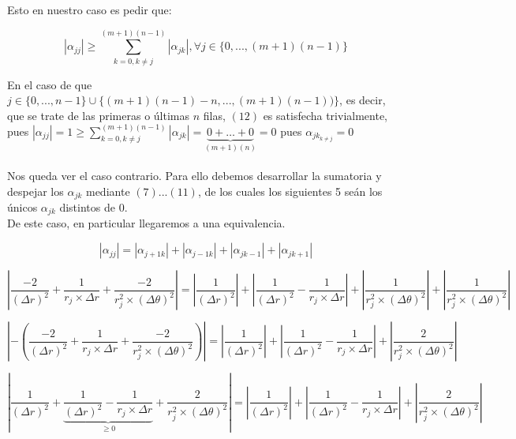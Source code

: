 Esto en nuestro caso es pedir que:

\begin{equation}
 \left | \alpha_{jj} \right | \geq \sum_{k=0,k \neq j}^{(m+1)(n-1)} \left | \alpha_{jk} \right |, \forall j \in \{ 0,...,(m+1)(n-1)\}
\end{equation}

En el caso de que $j \in \{0,...,n-1\} \cup \{(m+1)(n-1)-n,...,(m+1)(n-1))\}$, es decir, que se trate de las primeras o \'ultimas $n$ filas, $(12)$ es satisfecha trivialmente, pues  $\left | \alpha_{jj} \right | = 1 \geq \sum_{k=0,k \neq j}^{(m+1)(n-1)} \left | \alpha_{jk} \right | =  \underbrace{0+ \ldots +0}_{(m+1)(n)} = 0$ pues $\alpha_{jk_{k\neq j}}=0 $ 
\\
\\
Nos queda ver el caso contrario. Para ello debemos desarrollar la sumatoria y despejar los $\alpha_{jk}$ mediante $(7)...(11)$, de los cuales los siguientes 5 se\'an los \'unicos $\alpha_{jk}$ distintos de $0$.
\\
De este caso, en particular llegaremos a una equivalencia.

\begin{equation}
 \left | \alpha_{jj} \right | = \left | \alpha_{j+1k} \right | + \left | \alpha_{j-1k} \right | + \left | \alpha_{jk-1} \right | + \left | \alpha_{jk+1} \right |
\end{equation}

\begin{equation}
 \left | \frac{-2}{(\Delta r)^2} + \frac{1}{r_j \times \Delta r} + \frac{-2}{r_j^2 \times (\Delta \theta)^2} \right | = \left | \frac{1}{(\Delta r)^2} \right | + \left | \frac{1}{(\Delta r)^2} - \frac{1}{r_j \times \Delta r} \right | + \left | \frac{1}{r_j^2 \times (\Delta \theta)^2} \right | + \left | \frac{1}{r_j^2 \times (\Delta \theta)^2} \right |
\end{equation}

\begin{equation}
 \left | -\left ( \frac{-2}{(\Delta r)^2} + \frac{1}{r_j \times \Delta r} + \frac{-2}{r_j^2 \times (\Delta \theta)^2} \right ) \right | = \left | \frac{1}{(\Delta r)^2} \right | + \left | \frac{1}{(\Delta r)^2} - \frac{1}{r_j \times \Delta r} \right | + \left | \frac{2}{r_j^2 \times (\Delta \theta)^2} \right | 
\end{equation}

\begin{equation}
 \left | \frac{1}{(\Delta r)^2} + \underbrace{\frac{1}{(\Delta r)^2} - \frac{1}{r_j \times \Delta r}}_{ \geq 0} + \frac{2}{r_j^2 \times (\Delta \theta)^2} \right | = \left | \frac{1}{(\Delta r)^2} \right | + \left | \frac{1}{(\Delta r)^2} - \frac{1}{r_j \times \Delta r} \right | +  \left | \frac{2}{r_j^2 \times (\Delta \theta)^2} \right |
\end{equation}

